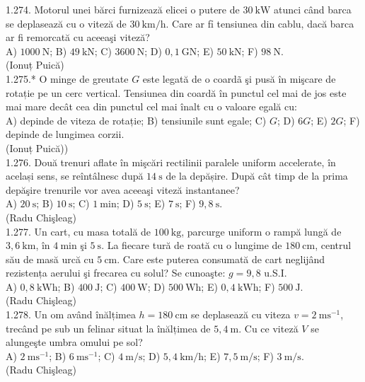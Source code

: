 1.274. Motorul unei bărci furnizează elicei o putere de $30 \mathrm{~kW}$ atunci când barca se deplasează cu o viteză de $30 \mathrm{~km} / \mathrm{h}$. Care ar fỉ tensiunea din cablu, dacă barca ar fi remorcată cu aceeaşi viteză?\\ A) $1000 \mathrm{~N}$; B) $49 \mathrm{~kN}$; C) $3600 \mathrm{~N}$; D) $0,1 \mathrm{~GN}$; E) $50 \mathrm{~kN}$; F) $98 \mathrm{~N}$.\\ (Ionuț Puică)\\

1.275.* O minge de greutate $G$ este legată de o coardã şi pusă în mişcare de rotație pe un cerc vertical. Tensiunea din coardă în punctul cel mai de jos este mai mare decât cea din punctul cel mai înalt cu o valoare egală cu:\\ A) depinde de viteza de rotație; B) tensiunile sunt egale; C) $G$; D) $6 G$; E) $2 G$; F) depinde de lungimea corzii.\\ (Ionuț Puică))\\

1.276. Două trenuri aflate în mişcări rectilinii paralele uniform accelerate, în același sens, se reîntâlnesc după $14 \mathrm{~s}$ de la depășire. După cât timp de la prima depăşire trenurile vor avea aceeaşi viteză instantanee?\\ A) $20 \mathrm{~s}$; B) $10 \mathrm{~s}$; C) $1 \mathrm{~min}$; D) $5 \mathrm{~s}$; E) $7 \mathrm{~s}$; F) $9,8 \mathrm{~s}$.\\ (Radu Chişleag)\\

1.277. Un cart, cu masa totală de $100 \mathrm{~kg}$, parcurge uniform o rampă lungă de $3,6 \mathrm{~km}$, în $4 \mathrm{~min}$ şi $5 \mathrm{~s}$. La fiecare tură de roată cu o lungime de $180 \mathrm{~cm}$, centrul său de masă urcă cu $5 \mathrm{~cm}$. Care este puterea consumată de cart neglijând rezistența aerului şi frecarea cu solul? Se cunoaşte: $g=9,8$ u.S.I.\\ A) $0,8 \mathrm{~kWh}$; B) $400 \mathrm{~J}$; C) $400 \mathrm{~W}$; D) $500 \mathrm{~Wh}$; E) $0,4 \mathrm{~kWh}$; F) $500 \mathrm{~J}$.\\ (Radu Chişleag)\\

1.278. Un om având înălțimea $h=180 \mathrm{~cm}$ se deplasează cu viteza $v=2 \mathrm{~ms}^{-1}$, trecând pe sub un felinar situat la înălțimea de $5,4 \mathrm{~m}$. Cu ce viteză $V$ se alungeşte umbra omului pe sol?\\ A) $2 \mathrm{~ms}^{-1}$; B) $6 \mathrm{~ms}^{-1}$; C) $4 \mathrm{~m} / \mathrm{s}$; D) $5,4 \mathrm{~km} / \mathrm{h}$; E) $7,5 \mathrm{~m} / \mathrm{s}$; F) $3 \mathrm{~m} / \mathrm{s}$.\\ (Radu Chişleag)\\

